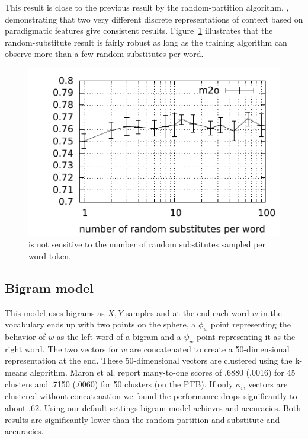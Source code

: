 This result is close to the previous result by the random-partition
algorithm, \rpmto, demonstrating that two very different discrete
representations of context based on paradigmatic features give
consistent results.  Figure~\ref{plot-s} illustrates that the
random-substitute result is fairly robust as long as the training
algorithm can observe more than a few random substitutes per word.

\begin{figure}[ht] \centering
\includegraphics[width=0.5\linewidth]{plot-s.pdf}
\caption{\mto is not sensitive to the number of random substitutes
  sampled per word token.}
\label{plot-s}
\end{figure}


\subsection{Bigram model}\label{sec:bigram}

This model uses bigrams as $X, Y$ samples and at the end each word $w$
in the vocabulary ends up with two points on the sphere, a $\phi_w$
point representing the behavior of $w$ as the left word of a bigram
and a $\psi_w$ point representing it as the right word.  The two
vectors for $w$ are concatenated to create a 50-dimensional
representation at the end.  These 50-dimensional vectors are clustered
using the k-means algorithm.  Maron et al. 
report many-to-one scores of .6880 (.0016) for 45 clusters and .7150
(.0060) for 50 clusters (on the PTB).  If only $\phi_w$ vectors are
clustered without concatenation we found the performance drops
significantly to about .62.  Using our default settings bigram model
achieves \bgmto \mto and \bgvm \vm accuracies.  Both results are
significantly lower than the random partition and substitute \mto and
\vm accuracies.
